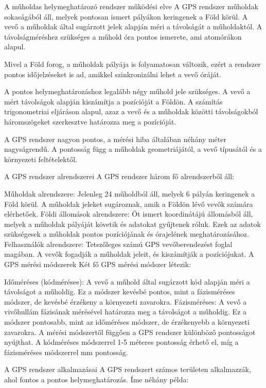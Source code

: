 \documentclass[10pt, conference,a4paper]{ITKproc}
\begin{document}
A műholdas helymeghatározó rendszer működési elve
A GPS rendszer műholdak sokaságából áll, melyek pontosan ismert pályákon keringenek a Föld körül. A vevő a műholdak által sugárzott jelek alapján méri a távolságát a műholdaktól. A távolságméréshez szükséges a műhold óra pontos ismerete, ami atomórákon alapul.

Mivel a Föld forog, a műholdak pályája is folyamatosan változik, ezért a rendszer pontos időjelzéseket is ad, amikkel szinkronizálni lehet a vevő óráját.

A pontos helymeghatározáshoz legalább négy műhold jele szükséges. A vevő a mért távolságok alapján kiszámítja a pozícióját a Földön. A számítás trigonometriai eljáráson alapul, azaz a vevő és a műholdak közötti távolságokból háromszögeket szerkesztve határozza meg a pozícióját.

A GPS rendszer nagyon pontos, a mérési hiba általában néhány méter nagyságrendű. A pontosság függ a műholdak geometriájától, a vevő típusától és a környezeti feltételektől.

A GPS rendszer alrendszerei
A GPS rendszer három fő alrendszerből áll:

Műholdak alrendszere: Jelenleg 24 műholdból áll, melyek 6 pályán keringenek a Föld körül. A műholdak jeleket sugároznak, amik a Földön lévő vevők számára elérhetőek.
Földi állomások alrendszere: Öt ismert koordinátájú állomásból áll, melyek a műholdak pályáját követik és adatokat gyűjtenek róluk. Ezek az adatok szükségesek a műholdak pontos pozíciójának és órajelének meghatározásához.
Felhasználók alrendszere: Tetszőleges számú GPS vevőberendezést foglal magában. A vevők fogadják a műholdak jeleit, és kiszámítják a pozíciójukat.
A GPS mérési módszerek
Két fő GPS mérési módszer létezik:

Időméréses (kódméréses): A vevő a műhold által sugárzott kód alapján méri a távolságot a műholdig. Ez a módszer kevésbé pontos, mint a fázisméréses módszer, de kevésbé érzékeny a környezeti zavarokra.
Fázisméréses: A vevő a vivőhullám fázisának mérésével határozza meg a távolságot a műholdig. Ez a módszer pontosabb, mint az időméréses módszer, de érzékenyebb a környezeti zavarokra.
A mérési módszertől függően a GPS rendszer különböző pontosságot nyújthat. A kódméréses módszerrel 1-5 méteres pontosság érhető el, míg a fázisméréses módszerrel mm pontosság.


A GPS rendszer alkalmazásai
A GPS rendszert számos területen alkalmazzák, ahol fontos a pontos helymeghatározás. Íme néhány példa:
\end{document}

